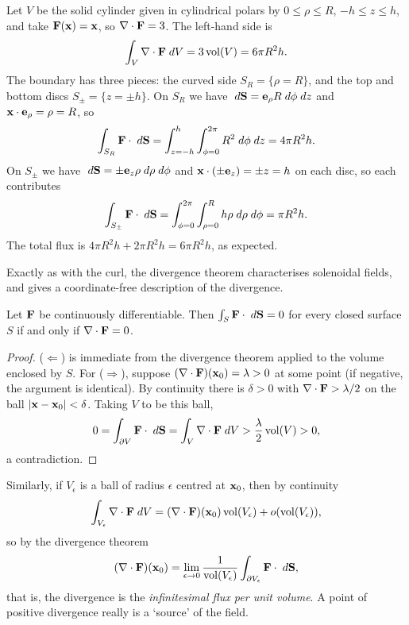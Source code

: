 \documentclass[a4paper]{scrartcl}
\begin{document}
\begin{example}
	Let $V$ be the solid cylinder given in cylindrical polars by $0 \leq \rho \leq R$, $-h \leq z \leq h$, and take $\mathbf{F}(\mathbf{x}) = \mathbf{x}$, so $\nabla \cdot \mathbf{F} = 3$. The left-hand side is
	$$
	\int_V \nabla \cdot \mathbf{F} \; d V = 3 \operatorname{vol}(V) = 6 \pi R^2 h.
	$$
	The boundary has three pieces: the curved side $S_R = \{\rho = R\}$, and the top and bottom discs $S_\pm = \{z = \pm h\}$. On $S_R$ we have $\; d \mathbf{S} = \mathbf{e}_\rho R \; d \phi \; d z$ and $\mathbf{x} \cdot \mathbf{e}_\rho = \rho = R$, so
	$$
	\int_{S_R} \mathbf{F} \cdot \; d \mathbf{S} = \int_{z = -h}^{h}\int_{\phi = 0}^{2 \pi} R^2 \; d \phi \; d z = 4 \pi R^2 h.
	$$
	On $S_\pm$ we have $\; d \mathbf{S} = \pm \mathbf{e}_z \rho \; d \rho \; d \phi$ and $\mathbf{x} \cdot (\pm\mathbf{e}_z) = \pm z = h$ on each disc, so each contributes
	$$
	\int_{S_\pm} \mathbf{F} \cdot \; d \mathbf{S} = \int_{\phi = 0}^{2\pi} \int_{\rho = 0}^R h \rho \; d \rho \; d \phi = \pi R^2 h.
	$$
	The total flux is $4 \pi R^2 h + 2 \pi R^2 h = 6 \pi R^2 h$, as expected.
\end{example}

Exactly as with the curl, the divergence theorem characterises solenoidal fields, and gives a coordinate-free description of the divergence.

\begin{proposition}
	Let $\mathbf{F}$ be continuously differentiable. Then $\int_S \mathbf{F} \cdot \; d \mathbf{S} = 0$ for every closed surface $S$ if and only if $\nabla \cdot \mathbf{F} = 0$.
\end{proposition}
\begin{proof}
	($\Leftarrow$) is immediate from the divergence theorem applied to the volume enclosed by $S$. For ($\Rightarrow$), suppose $(\nabla \cdot \mathbf{F})(\mathbf{x}_0) = \lambda > 0$ at some point (if negative, the argument is identical). By continuity there is $\delta > 0$ with $\nabla \cdot \mathbf{F} > \lambda/2$ on the ball $|\mathbf{x} - \mathbf{x}_0| < \delta$. Taking $V$ to be this ball,
	$$
	0 = \int_{\partial V} \mathbf{F} \cdot \; d \mathbf{S} = \int_V \nabla \cdot \mathbf{F} \; d V > \frac{\lambda}{2}\operatorname{vol}(V) > 0,
	$$
	a contradiction.
\end{proof}

Similarly, if $V_\epsilon$ is a ball of radius $\epsilon$ centred at $\mathbf{x}_0$, then by continuity
$$
\int_{V_\epsilon} \nabla \cdot \mathbf{F} \; d V = (\nabla \cdot \mathbf{F})(\mathbf{x}_0) \operatorname{vol}(V_\epsilon) + o(\operatorname{vol}(V_\epsilon)),
$$
so by the divergence theorem
$$
(\nabla \cdot \mathbf{F})(\mathbf{x}_0) = \lim_{\epsilon \to 0} \frac{1}{\operatorname{vol}(V_\epsilon)} \int_{\partial V_\epsilon} \mathbf{F} \cdot \; d \mathbf{S},
$$
that is, the divergence is the \emph{infinitesimal flux per unit volume}. A point of positive divergence really is a `source' of the field.
\end{document}
